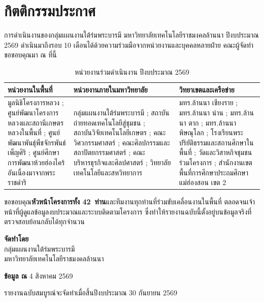 \chapter*{กิตติกรรมประกาศ}

การดำเนินงานของกลุ่มแผนงานใต้ร่มพระบารมี มหาวิทยาลัยเทคโนโลยีราชมงคลล้านนา
ปีงบประมาณ 2569 ดำเนินมาถึงรอบ 10 เดือนได้ด้วยความร่วมมือจากหน่วยงานและบุคคลหลายฝ่าย
คณะผู้จัดทำขอขอบคุณมา ณ ที่นี้

\begin{table}[H]
\centering
\caption{หน่วยงานร่วมดำเนินงาน ปีงบประมาณ 2569}
\small
\begin{tabular}{L{4.35cm}L{4.35cm}L{4.35cm}}
\toprule
{}
\textbf{หน่วยงานในพื้นที่} & \textbf{หน่วยงานภายในมหาวิทยาลัย} & \textbf{วิทยาเขตและเครือข่าย}\\
\midrule
มูลนิธิโครงการหลวง ;
ศูนย์พัฒนาโครงการหลวงและสถานีเกษตรหลวงในพื้นที่ ;
ศูนย์พัฒนาพันธุ์พืชจักรพันธ์เพ็ญศิริ ;
ศูนย์ศึกษาการพัฒนาห้วยฮ่องไคร้อันเนื่องมาจากพระราชดำริ
&
กลุ่มแผนงานใต้ร่มพระบารมี ;
สถาบันถ่ายทอดเทคโนโลยีสู่ชุมชน ;
สถาบันวิจัยเทคโนโลยีเกษตร ;
คณะวิศวกรรมศาสตร์ ;
คณะศิลปกรรมและสถาปัตยกรรมศาสตร์ ;
คณะบริหารธุรกิจและศิลปศาสตร์ ;
วิทยาลัยเทคโนโลยีและสหวิทยาการ
&
มทร.ล้านนา เชียงราย ;
มทร.ล้านนา น่าน ;
มทร.ล้านนา ตาก ;
มทร.ล้านนา พิษณุโลก ;
โรงเรียนพระปริยัติธรรมและสถานศึกษาในพื้นที่ ;
วัดและวิสาหกิจชุมชนร่วมโครงการ ;
สำนักงานเขตพื้นที่การศึกษาประถมศึกษาแม่ฮ่องสอน เขต 2
\\
\bottomrule
\end{tabular}
\end{table}

ขอขอบคุณ\textbf{หัวหน้าโครงการทั้ง 42~ท่าน}และทีมงานทุกท่านที่ร่วมขับเคลื่อนงานในพื้นที่
ตลอดจนเจ้าหน้าที่ผู้ดูแลข้อมูลงบประมาณและระบบติดตามโครงการ
ซึ่งทำให้รายงานฉบับนี้ตั้งอยู่บนข้อมูลจริงที่ตรวจสอบย้อนกลับได้ทุกจำนวน

\vspace{24pt}
\begin{center}
\begin{minipage}{0.62\textwidth}
\centering
\small
\textbf{จัดทำโดย}\\
กลุ่มแผนงานใต้ร่มพระบารมี\\
มหาวิทยาลัยเทคโนโลยีราชมงคลล้านนา\par\vspace{8pt}
\textbf{ข้อมูล ณ} 4 สิงหาคม 2569\par\vspace{4pt}
รายงานฉบับสมบูรณ์จะจัดทำเมื่อสิ้นปีงบประมาณ 30 กันยายน 2569
\end{minipage}
\end{center}
